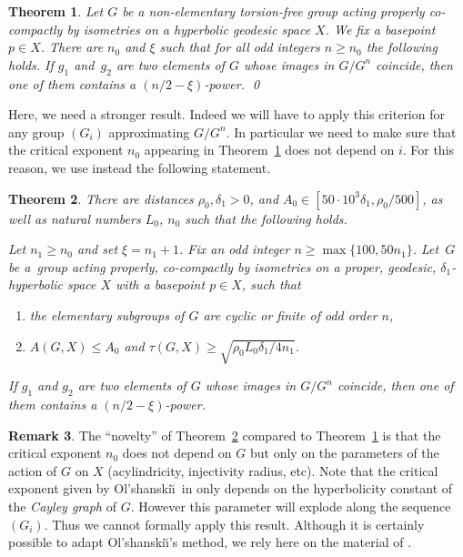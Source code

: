 \documentclass[11pt]{article}
\theoremstyle{plain}
\newtheorem{thm}{Theorem}[section]
\theoremstyle{definition}
\newtheorem{rem}[thm]{Remark}
\begin{document}
\begin{thm}
\label{T: non-triviality of Burnside groups}
Let $G$ be a non-elementary torsion-free group acting properly co-compactly by isometries on a hyperbolic geodesic space $X$.
We fix a basepoint $p \in X$.
There are $n_0$ and $\xi$ such that for all odd integers $n\geqslant n_0$ the following holds.
If $g_1$ and~$g_2$ are two elements of $G$ whose images in $G/G^n$ coincide, then one of them contains a $(n/2-\xi)$-power. \qed
\end{thm}

Here, we need a stronger result.
Indeed we will have to apply this criterion for any group $(G_i)$ approximating $G/G^n$.
In particular we need to make sure that the critical exponent $n_0$ appearing in Theorem~\ref{T: non-triviality of Burnside groups} does not depend on $i$.
For this reason, we use instead the following statement.

\begin{thm}
\label{T: uniform non-triviality of Burnside groups}
There are distances $\rho_0,\delta_1> 0$, and $A_0 \in [50 \cdot 10^3\delta_1, \rho_0/500]$, as well as natural numbers $L_0$, $n_0$ such that the following holds.

Let $n_1 \geq n_0$ and set $\xi = n_1+ 1$.
Fix an odd integer $n \geq \max\{100, 50n_1\}$.
Let~$G$ be a~group acting properly, co-compactly by isometries on a proper, geodesic, $\delta_1$-hyperbolic space $X$ with a basepoint $p \in X$, such that
\begin{enumerate}
\item
the elementary subgroups of $G$ are cyclic or finite of odd order $n$,
\item
$A(G,X)\leqslant A_0$ and $\tau(G,X)\geqslant \sqrt{\rho_0 L_0 \delta_1/4n_1}$.
\end{enumerate}
If $g_1$ and $g_2$ are two elements of $G$ whose images in $G/G^n$ coincide, then one of them contains a $(n/2-\xi)$-power.
\end{thm}

\begin{rem}
The ``novelty'' of Theorem~\ref{T: uniform non-triviality of Burnside groups} compared to Theorem~\ref{T: non-triviality of Burnside groups} is that the critical exponent $n_0$ does not depend on $G$ but only on the parameters of the action of $G$ on $X$ (acylindricity, injectivity radius, etc).
Note that the critical exponent given by Ol'shanski\u\i\ in \cite{olshanskii_periodic_1991} only depends on the hyperbolicity constant of the \emph{Cayley graph} of $G$.
However this parameter will explode along the sequence $(G_i)$.
Thus we cannot formally apply this result.
Although it is certainly possible to adapt Ol'shanski\u\i's method, we rely here on the material of \cite{coulon_detecting_2018}.
\end{rem}
\end{document}
